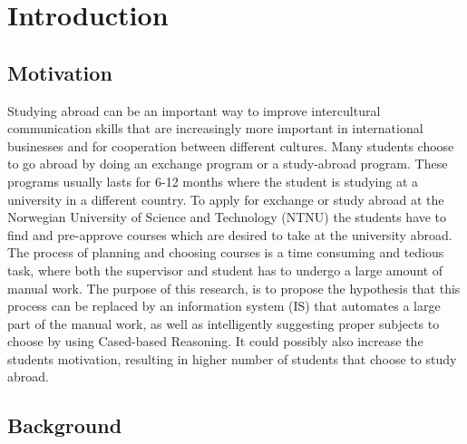 
\chapter{Introduction}

\section{Motivation}

Studying abroad can be an important way to improve intercultural communication skills that are increasingly more important in international businesses and for cooperation between different cultures.\cite{Williams} Many students choose to go abroad by doing an exchange program or a study-abroad program. These programs usually lasts for 6-12 months where the student is studying at a university in a different country. To apply for exchange or study abroad at the Norwegian University of Science and Technology (NTNU) the students have to find and pre-approve courses which are desired to take at the university abroad. The process of planning and choosing courses is a time consuming and tedious task, where both the supervisor and student has to undergo a large amount of manual work. The purpose of this research, is to propose the hypothesis that this process can be replaced by an information system (IS) that automates a large part of the manual work, as well as intelligently suggesting proper subjects to choose by using Cased-based Reasoning. It could possibly also increase the students motivation, resulting in higher number of students that choose to study abroad.


\section{Background}

